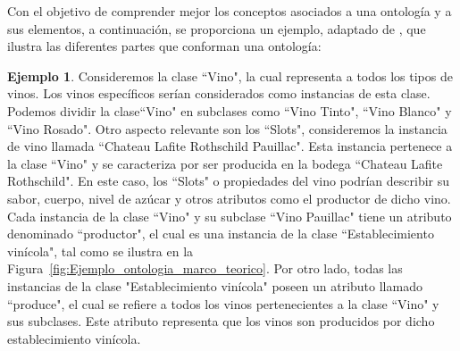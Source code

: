 \documentclass[10pt, a4paper,openany]{book}
\theoremstyle{definition}
\newtheorem{exmp}{Ejemplo}[section]
\begin{document}
\label{Ej: Ontologia marco teorico}

Con el objetivo de comprender mejor los conceptos asociados a una ontología y a sus elementos, a continuación, se proporciona un ejemplo, adaptado de \cite{filho_ontology_nodate}, que ilustra las diferentes partes que conforman una ontología: 
\begin{exmp}
Consideremos la clase ``Vino", la cual representa a todos los tipos de vinos. 
Los vinos específicos serían considerados como instancias de esta clase. 
Podemos dividir la clase``Vino" en subclases como ``Vino Tinto", ``Vino Blanco" y ``Vino Rosado". 
Otro aspecto relevante son los ``Slots", consideremos la instancia de vino llamada ``Chateau Lafite Rothschild Pauillac".
Esta instancia pertenece a la clase ``Vino" y se caracteriza por ser producida en la bodega ``Chateau Lafite Rothschild".
En este caso, los ``Slots" o propiedades del vino podrían describir su sabor, cuerpo, nivel de azúcar y otros atributos como el productor de dicho vino.
Cada instancia de la clase ``Vino" y su subclase ``Vino Pauillac" tiene un atributo denominado ``productor", el cual es una instancia de la clase ``Establecimiento vinícola", tal como se ilustra en la Figura~\ref{fig:Ejemplo_ontologia_marco_teorico}.
Por otro lado, todas las instancias de la clase "Establecimiento vinícola" poseen un atributo llamado ``produce", el cual se refiere a todos los vinos pertenecientes a la clase ``Vino" y sus subclases. Este atributo representa que los vinos son producidos por dicho establecimiento vinícola.
\end{exmp}
    
\end{document}
